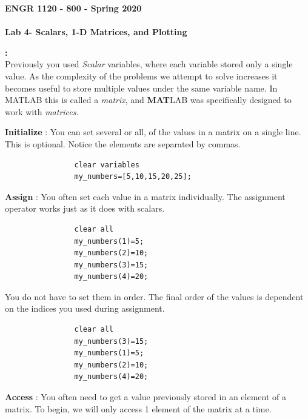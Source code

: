 \documentclass[11pt]{article}
\newcommand{\NUM}{4}
\begin{document}
	\textbf{\LARGE ENGR 1120 - 800 - Spring 2020} \\\\
	\textbf{\LARGE Lab \NUM \hspace{2mm}- Scalars, 1-D Matrices, and Plotting} 
		
	\begin{description}
	\vspace{5mm}
		\item [\textbf{ \Large Overview}] \textbf{ \Large :}\\
			Previously you used {\it Scalar} variables, where each variable stored only a single value. As the complexity of the problems we attempt to solve increases it becomes useful to store multiple values under the same variable name. In MATLAB this is called a {\it matrix}, and {\bf MAT}LAB was specifically designed to work with {\it matrices}.

        \begin{description}

            \item \textbf {Initialize} : You can set several or all, of the values in a matrix on a single line. This is optional. Notice the elements are separated by commas.
                \begin{verbatim}
                clear variables
                my_numbers=[5,10,15,20,25];
                \end{verbatim}
            \item \textbf {Assign} : You often set each value in a matrix individually. The assignment operator works just as it does with scalars.			
                \begin{verbatim}
                clear all
                my_numbers(1)=5;
                my_numbers(2)=10;
                my_numbers(3)=15;
                my_numbers(4)=20;		
                \end{verbatim}
            
            You do not have to set them in order. The final order of the values is dependent on the indices you used during assignment.
                \begin{verbatim}
                clear all
                my_numbers(3)=15;
                my_numbers(1)=5;
                my_numbers(2)=10;
                my_numbers(4)=20;			
                \end{verbatim}

            \item \textbf {Access} : You often need to get a value previously stored in an element of a matrix. To begin, we will only access 1 element of the matrix at a time. 
           

\end{description}
\end{description}
\end{document}
